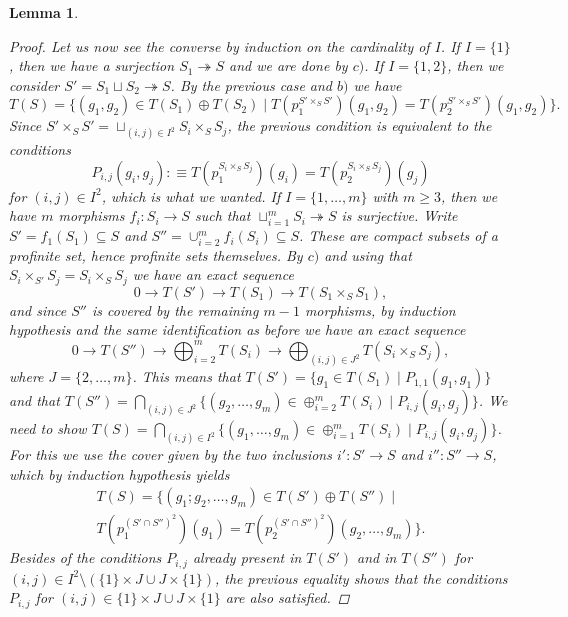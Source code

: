 \documentclass[11pt,A4]{article}
\theoremstyle{plain}
\newtheorem{lm}[thm]{Lemma}
\theoremstyle{definition}
\theoremstyle{remark}
\newcommand{\op}{\oplus}
\newcommand{\fp}[1]{\times_{#1}}
\begin{document}
\begin{lm}
\begin{proof}
	Let us now see the converse by induction on the cardinality of $I$.
	If $I=\{1\}$, then we have a surjection $S_{1}\twoheadrightarrow S$ and we are done by $c)$.
	If $I=\{1,2\}$, then we consider $S'=S_{1}\sqcup S_{2}\twoheadrightarrow S$.
	By the previous case and $b)$ we have
	\[ T(S)=\{(g_{1},g_{2})\in T(S_{1})\op T(S_{2})\mid T(p_{1}^{S'\fp{S}S'})(g_{1},g_{2})=T(p_{2}^{S'\fp{S}S'})(g_{1},g_{2})\}.\]
	Since $S'\fp{S}S'=\sqcup_{(i,j)\in I^{2}}S_{i}\fp{S}S_{j}$, the previous condition is equivalent to the conditions
	\[ P_{i,j}(g_{i},g_{j}):\equiv T(p_{1}^{S_{i}\fp{S}S_{j}})(g_{i})=T(p_{2}^{S_{i}\fp{S}S_{j}})(g_{j}) \]
	for $(i,j)\in I^{2}$, which is what we wanted.
	If $I=\{ 1,\ldots, m\}$ with $m\geqslant 3$, then we have $m$ morphisms $f_{i}\colon S_{i}\to S$ such that $\sqcup_{i=1}^{m} S_{i}\twoheadrightarrow S$ is surjective.
	Write $S'=f_{1}(S_{1})\subseteq S$ and $S''=\cup_{i=2}^{m}f_{i}(S_{i})\subseteq S$.
	These are compact subsets of a profinite set, hence profinite sets themselves.
	By $c)$ and using that $S_{i}\fp{S'}S_{j}=S_{i}\fp{S}S_{j}$ we have an exact sequence
	\[ 0\to T(S')\to T(S_{1})\to T(S_{1}\times_{S}S_{1}), \]
	and since $S''$ is covered by the remaining $m-1$ morphisms, by induction hypothesis and the same identification as before we have an exact sequence
	\[ 0\to T(S'')\to \bigoplus_{i=2}^{m}T(S_{i})\to \bigoplus_{(i,j)\in J^{2}} T(S_{i}\fp{S}S_{j}), \]
	where $J=\{2,\ldots,m\}$.
	This means that $T(S')=\{g_{1}\in T(S_{1})\mid P_{1,1}(g_{1},g_{1})\}$ and that $T(S'')=\bigcap_{(i,j)\in J^{2}}\{(g_{2},\ldots,g_{m})\in \op_{i=2}^{m}T(S_{i})\mid P_{i,j}(g_{i},g_{j})\}$.
	We need to show $T(S)=\bigcap_{(i,j)\in I^{2}}\{ (g_{1},\ldots,g_{m})\in \op_{i=1}^{m}T(S_{i})\mid P_{i,j}(g_{i},g_{j})\}$.
	For this we use the cover given by the two inclusions $i'\colon S'\to S$ and $i''\colon S''\to S$, which by induction hypothesis yields
	\begin{multline*}
	T(S)=\{(g_{1};g_{2},\ldots,g_{m})\in T(S')\op T(S'')\mid \\
	T(p_{1}^{(S'\cap S'')^{2}})(g_{1})=T(p_{2}^{(S'\cap S'')^{2}})(g_{2},\ldots,g_{m})\}.
	\end{multline*}
	Besides of the conditions $P_{i,j}$ already present in $T(S')$ and in $T(S'')$ for $(i,j)\in I^{2}\setminus (\{1\}\times J\cup J\times \{1\})$, the previous equality shows that the conditions $P_{i,j}$ for $(i,j)\in \{1\}\times J\cup J\times \{1\}$ are also satisfied.
    \end{proof}
\end{lm}
\end{document}
